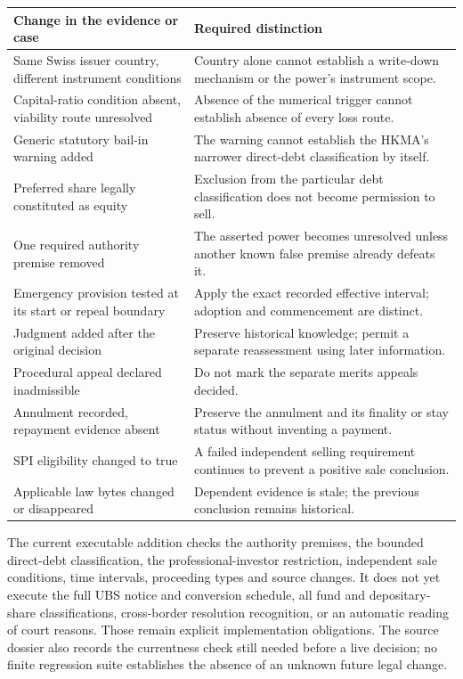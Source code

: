 \begin{longtable}{P{0.30\textwidth}P{0.62\textwidth}}
\toprule
Change in the evidence or case & Required distinction \\
\midrule
\endhead
Same Swiss issuer country, different instrument conditions & Country alone
cannot establish a write-down mechanism or the power's instrument scope. \\
Capital-ratio condition absent, viability route unresolved & Absence of the
numerical trigger cannot establish absence of every loss route. \\
Generic statutory bail-in warning added & The warning cannot establish the
HKMA's narrower direct-debt classification by itself. \\
Preferred share legally constituted as equity & Exclusion from the particular
debt classification does not become permission to sell. \\
One required authority premise removed & The asserted power becomes unresolved
unless another known false premise already defeats it. \\
Emergency provision tested at its start or repeal boundary & Apply the exact
recorded effective interval; adoption and commencement are distinct. \\
Judgment added after the original decision & Preserve historical knowledge;
permit a separate reassessment using later information. \\
Procedural appeal declared inadmissible & Do not mark the separate merits
appeals decided. \\
Annulment recorded, repayment evidence absent & Preserve the annulment and
its finality or stay status without inventing a payment. \\
SPI eligibility changed to true & A failed independent selling requirement
continues to prevent a positive sale conclusion. \\
Applicable law bytes changed or disappeared & Dependent evidence is stale;
the previous conclusion remains historical. \\
\bottomrule
\end{longtable}

The current executable addition checks the authority premises, the bounded
direct-debt classification, the professional-investor restriction, independent
sale conditions, time intervals, proceeding types and source changes. It does
not yet execute the full UBS notice and conversion schedule, all fund and
depositary-share classifications, cross-border resolution recognition, or an
automatic reading of court reasons. Those remain explicit implementation
obligations. The source dossier also records the currentness check still needed
before a live decision; no finite regression suite establishes the absence of
an unknown future legal change.

